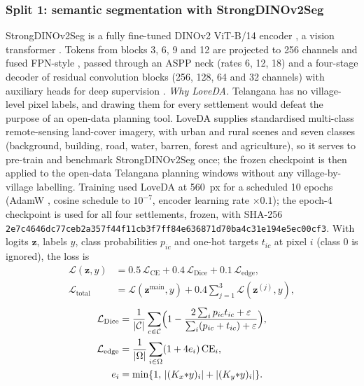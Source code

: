 \documentclass[preprint,12pt]{elsarticle}
\newcommand{\dinoseg}{StrongDINOv2Seg}
\begin{document}
\subsubsection{Split 1: semantic segmentation with StrongDINOv2Seg}\label{sec:seg}
\dinoseg{} is a fully fine-tuned DINOv2 ViT-B/14 encoder \cite{oquab2023dinov2}, a vision transformer \cite{dosovitskiy2021vit}. Tokens from blocks 3, 6, 9 and 12 are projected to 256 channels and fused FPN-style \cite{lin2017fpn}, passed through an ASPP neck (rates 6, 12, 18) \cite{chen2018deeplabv3plus} and a four-stage decoder of residual convolution blocks \cite{he2016resnet} (256, 128, 64 and 32 channels) with auxiliary heads for deep supervision \cite{lee2015dsn}. \emph{Why LoveDA.} Telangana has no village-level pixel labels, and drawing them for every settlement would defeat the purpose of an open-data planning tool. LoveDA \cite{wang2021loveda} supplies standardised multi-class remote-sensing land-cover imagery, with urban and rural scenes and seven classes (background, building, road, water, barren, forest and agriculture), so it serves to pre-train and benchmark \dinoseg{} once; the frozen checkpoint is then applied to the open-data Telangana planning windows without any village-by-village labelling. Training used LoveDA at 560~px for a scheduled 10 epochs (AdamW \cite{loshchilov2019adamw}, cosine schedule \cite{loshchilov2017sgdr} to $10^{-7}$, encoder learning rate $\times 0.1$); the epoch-4 checkpoint is used for all four settlements, frozen, with SHA-256 \texttt{2e7c4646dc77ceb2\allowbreak a357f44f11cb3f7f\allowbreak f84e636871d70ba4\allowbreak c31e194e5ec00cf3}. With logits $\mathbf z$, labels $y$, class probabilities $p_{ic}$ and one-hot targets $t_{ic}$ at pixel $i$ (class 0 is ignored), the loss is
\begin{equation}
\begin{aligned}
\mathcal L(\mathbf z,y)&=0.5\,\mathcal L_{\mathrm{CE}}+0.4\,\mathcal L_{\mathrm{Dice}}+0.1\,\mathcal L_{\mathrm{edge}},\\
\mathcal L_{\mathrm{total}}&=\mathcal L(\mathbf z^{\mathrm{main}},y)+0.4\sum_{j=1}^{3}\mathcal L(\mathbf z^{(j)},y),
\end{aligned}
\label{eq:loss}
\end{equation}
\begin{equation}
\begin{aligned}
\mathcal L_{\mathrm{Dice}}&=\frac1{|\mathcal C|}\sum_{c\in\mathcal C}\Bigl(1-\frac{2\sum_i p_{ic}t_{ic}+\varepsilon}{\sum_i (p_{ic}+t_{ic})+\varepsilon}\Bigr),\\
\mathcal L_{\mathrm{edge}}&=\frac1{|\Omega|}\sum_{i\in\Omega}(1+4e_i)\,\mathrm{CE}_i,\\
e_i&=\min\{1,\,|(K_x{*}y)_i|+|(K_y{*}y)_i|\}.
\end{aligned}
\label{eq:diceedge}
\end{equation}
\end{document}
